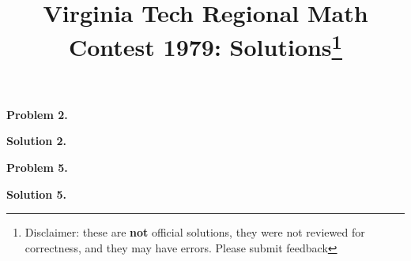 \documentclass[10pt]{article}
\newcommand{\problem}[1]{\textbf{Problem #1.}}
\newcommand{\solution}[1]{\textbf{Solution #1.}}
\newcommand{\disclaimer}{
  Disclaimer: these are \textbf{not} official solutions, they were not reviewed
  for correctness, and they may have errors. Please submit feedback 
}
\begin{document}
\title{Virginia Tech Regional Math Contest 1979: Solutions\footnote{\disclaimer}}
\author{\vspace{-2ex}}
\date{\vspace{-5ex}} %
\maketitle

% 
% 

\problem{2}


\solution{2}


% 
% 

% 
% 

\problem{5}


\solution{5}


% 
% 

% 
% 

% 
% 
\end{document}
